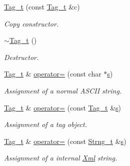\begin{DoxyCompactItemize}
\item 
\hyperlink{class_d_d4hep_1_1_x_m_l_1_1_tag__t_a098fcb4e75ad5b52a8f02e10e5672ad9}{Tag\_\-t} (const \hyperlink{class_d_d4hep_1_1_x_m_l_1_1_tag__t}{Tag\_\-t} \&c)
\begin{DoxyCompactList}\small\item\em Copy constructor. \item\end{DoxyCompactList}\item 
\hyperlink{class_d_d4hep_1_1_x_m_l_1_1_tag__t_aa35071670ab5dcfe1c20aa8370c818a7}{$\sim$Tag\_\-t} ()
\begin{DoxyCompactList}\small\item\em Destructor. \item\end{DoxyCompactList}\item 
\hyperlink{class_d_d4hep_1_1_x_m_l_1_1_tag__t}{Tag\_\-t} \& \hyperlink{class_d_d4hep_1_1_x_m_l_1_1_tag__t_a170961001c2a13473b9258cd92a27faf}{operator=} (const char $\ast$\hyperlink{_volumes_8cpp_a17ca6bfc8040d695d3cada22a4763d40}{s})
\begin{DoxyCompactList}\small\item\em Assignment of a normal ASCII string. \item\end{DoxyCompactList}\item 
\hyperlink{class_d_d4hep_1_1_x_m_l_1_1_tag__t}{Tag\_\-t} \& \hyperlink{class_d_d4hep_1_1_x_m_l_1_1_tag__t_a1869e32e13504b08283ca87cfc1ad82a}{operator=} (const \hyperlink{class_d_d4hep_1_1_x_m_l_1_1_tag__t}{Tag\_\-t} \&\hyperlink{_volumes_8cpp_a17ca6bfc8040d695d3cada22a4763d40}{s})
\begin{DoxyCompactList}\small\item\em Assignment of a tag object. \item\end{DoxyCompactList}\item 
\hyperlink{class_d_d4hep_1_1_x_m_l_1_1_tag__t}{Tag\_\-t} \& \hyperlink{class_d_d4hep_1_1_x_m_l_1_1_tag__t_af2111caa12315241c91c1414566aad0b}{operator=} (const \hyperlink{class_d_d4hep_1_1_x_m_l_1_1_strng__t}{Strng\_\-t} \&\hyperlink{_volumes_8cpp_a17ca6bfc8040d695d3cada22a4763d40}{s})
\begin{DoxyCompactList}\small\item\em Assignment of a internal \hyperlink{union_xml}{Xml} string. \item\end{DoxyCompactList}\item 

\end{DoxyCompactItemize}
